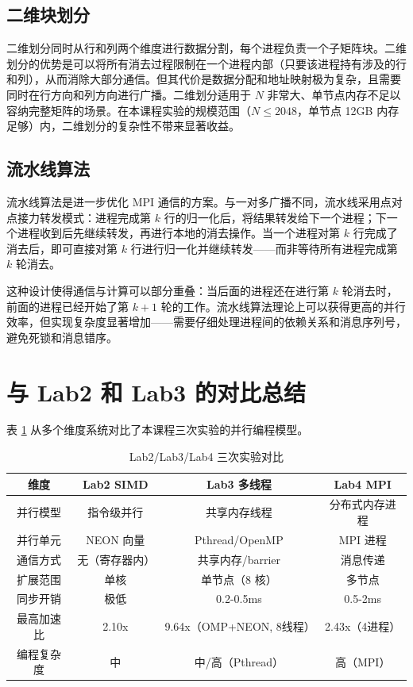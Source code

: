 \documentclass[a4paper]{article}
\begin{document}
\subsection{二维块划分}

二维划分同时从行和列两个维度进行数据分割，每个进程负责一个子矩阵块。二维划分的优势是可以将所有消去过程限制在一个进程内部（只要该进程持有涉及的行和列），从而消除大部分通信。但其代价是数据分配和地址映射极为复杂，且需要同时在行方向和列方向进行广播。二维划分适用于 $N$ 非常大、单节点内存不足以容纳完整矩阵的场景。在本课程实验的规模范围（$N \leq 2048$，单节点 12GB 内存足够）内，二维划分的复杂性不带来显著收益。

\subsection{流水线算法}

流水线算法是进一步优化 MPI 通信的方案。与一对多广播不同，流水线采用点对点接力转发模式：进程完成第 $k$ 行的归一化后，将结果转发给下一个进程；下一个进程收到后先继续转发，再进行本地的消去操作。当一个进程对第 $k$ 行完成了消去后，即可直接对第 $k$ 行进行归一化并继续转发——而非等待所有进程完成第 $k$ 轮消去。

这种设计使得通信与计算可以部分重叠：当后面的进程还在进行第 $k$ 轮消去时，前面的进程已经开始了第 $k+1$ 轮的工作。流水线算法理论上可以获得更高的并行效率，但实现复杂度显著增加——需要仔细处理进程间的依赖关系和消息序列号，避免死锁和消息错序。

\section{与 Lab2 和 Lab3 的对比总结}

表 \ref{table:comparison} 从多个维度系统对比了本课程三次实验的并行编程模型。

\begin{table}[H]
  \centering
  \caption{Lab2/Lab3/Lab4 三次实验对比}
  \label{table:comparison}
  \begin{tabular}{|c|c|c|c|}
  \hline
  \textbf{维度} & \textbf{Lab2 SIMD} & \textbf{Lab3 多线程} & \textbf{Lab4 MPI} \\
  \hline
  并行模型 & 指令级并行 & 共享内存线程 & 分布式内存进程 \\
  \hline
  并行单元 & NEON 向量 & Pthread/OpenMP & MPI 进程 \\
  \hline
  通信方式 & 无（寄存器内） & 共享内存/barrier & 消息传递 \\
  \hline
  扩展范围 & 单核 & 单节点（8 核） & 多节点 \\
  \hline
  同步开销 & 极低 & 0.2-0.5ms & 0.5-2ms \\
  \hline
  最高加速比 & 2.10x & 9.64x（OMP+NEON, 8线程） & 2.43x（4进程） \\
  \hline
  编程复杂度 & 中 & 中/高（Pthread） & 高（MPI） \\
  \hline
\end{tabular}
\end{table}
\end{document}
